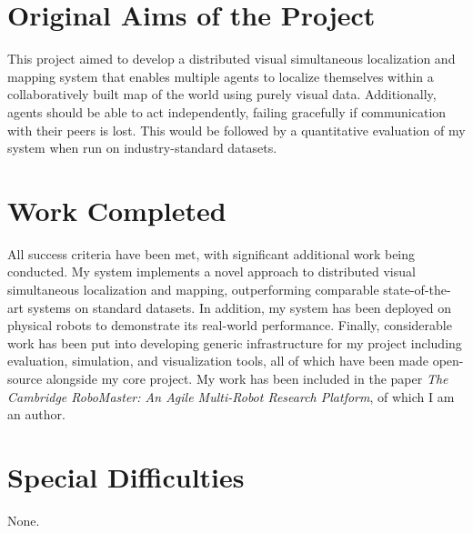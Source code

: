\documentclass[12pt,a4paper,twoside,openright]{report}
\begin{document}
\section*{Original Aims of the Project}

This project aimed to develop a distributed visual simultaneous localization and mapping system that enables multiple agents to localize themselves within a collaboratively built map of the world using purely visual data. Additionally, agents should be able to act independently, failing gracefully if communication with their peers is lost. This would be followed by a quantitative evaluation of my system when run on industry-standard datasets.

\section*{Work Completed}

All success criteria have been met, with significant additional work being conducted. My system implements a novel approach to distributed visual simultaneous localization and mapping, outperforming comparable state-of-the-art systems on standard datasets. In addition, my system has been deployed on physical robots to demonstrate its real-world performance. Finally, considerable work has been put into developing generic infrastructure for my project including evaluation, simulation, and visualization tools, all of which have been made open-source alongside my core project. My work has been included in the paper \textit{The Cambridge RoboMaster: An Agile Multi-Robot Research Platform}, of which I am an author.

\section*{Special Difficulties}

None.

\newpage

\setcounter{tocdepth}{4}
\setcounter{secnumdepth}{4}
\tableofcontents


\newpage
{}
\setcounter{page}{1}



\end{document}
